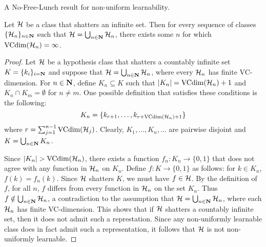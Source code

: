 A No-Free-Lunch result for non-uniform learnability.
\begin{theorem}
\label{thm:NFL_NUL}
Let $\mathcal{H}$ be a class that shatters an infinite set. Then for every 
sequence of classes $\{ \mathcal{H}_n \}_{n \in \mathbf{N}}$ such that 
$\mathcal{H} = \bigcup_{n \in \mathbf{N}} \mathcal{H}_n$, there exists some $n$ 
for which $\text{VCdim} (\mathcal{H}_n) = \infty$.
\begin{proof}
Let $\mathcal{H}$ be a hypothesis class that shatters a countably infinite 
set $K = \{k_i\}_{i = \mathbf{N}}$ and suppose that $\mathcal{H} = \bigcup_{n \in \mathbf{N}} \mathcal{H}_n$,
where every $\mathcal{H}_n$ has finite VC-dimension. For $n \in \mathbf{N}$, 
define $K_n \subseteq K$ such that $|K_n| = \text{VCdim} (\mathcal{H}_n) + 1$ and 
$K_n \cap K_m = \emptyset$ for $n \neq m$. One possible definition that 
satisfies these conditions is the following:
\[
    K_n = \{k_{r + 1}, \ldots, k_{r + \text{VCdim}(\mathcal{H}_n) + 1}\}
\]
where $r = \sum_{j = 1}^{n - 1} \text{VCdim} (\mathcal{H}_j)$. Clearly, $K_1, \ldots, K_n, \ldots$
are pairwise disjoint and $K = \bigcup_{n \in \mathbf{N}} K_n$. 

Since $|K_n| > \text{VCdim} (\mathcal{H}_n)$, there exists a function $f_n \colon K_n \rightarrow \{0, 1\}$
that does not agree with any function in $\mathcal{H}_n$ on $K_n$. Define 
$f \colon K \rightarrow \{0, 1\}$ as follows: for $k \in K_n$, $f(k) = f_n(k)$. Since 
$\mathcal{H}$ shatters $K$, we must have $f \in \mathcal{H}$. By the definition of $f$, 
for all $n$, $f$ differs from every function in $\mathcal{H}_n$ on the set $K_n$. Thus 
$f \notin \bigcup_{n \in \mathbf{N}} \mathcal{H}_n$, a contradiction to the assumption 
that $\mathcal{H} = \bigcup_{n \in \mathbf{N}} \mathcal{H}_n$, where each $\mathcal{H}_n$ 
has finite VC-dimension. This shows that if $\mathcal{H}$ shatters a countably
infinite set, then it does not admit such a represtation. Since any 
non-uniformly learnable class does in fact admit such a representation, it 
follows that $\mathcal{H}$ is not non-uniformly learnable. 
\end{proof}
\end{theorem}
